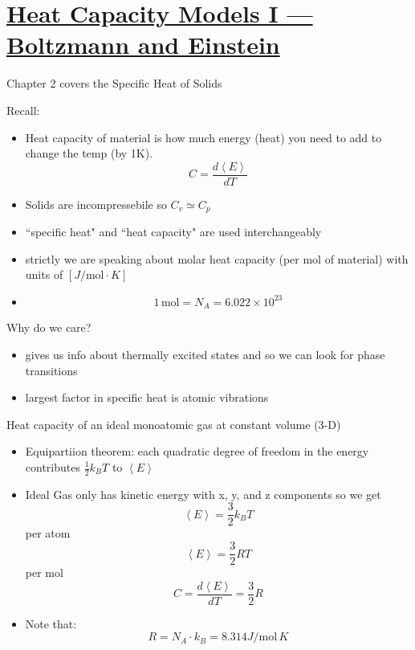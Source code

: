 \section[Heat Capacity Models I — Boltzmann and Einstein]{\hyperlink{toc}{Heat Capacity Models I — Boltzmann and Einstein}}


Chapter 2 covers the Specific Heat of Solids

Recall:
\begin{itemize}
    \item Heat capacity of material is how much energy (heat) you need to add to change the temp (by 1K).
    \begin{equation}
        C = \frac{d \left<E \right>}{dT}
    \end{equation}

    \item Solids are incompressebile so $C_v \simeq C_p $
    \item ``specific heat" and ``heat capacity" are used interchangeably
    \item strictly we are speaking about molar heat capacity (per mol of material) with units of $\left[ J/\text{mol}\cdot K\right]$
    \item 
    \[ 1 \, \text{mol} = N_A = 6.022 \times 10^{23}\]

\end{itemize}

Why do we care?

\begin{itemize}
    \item gives us info about thermally excited states and so we can look for phase transitions 
    \item largest factor in specific heat is atomic vibrations
\end{itemize}

Heat capacity of an ideal monoatomic gas at constant volume (3-D)
\begin{itemize}
    \item Equipartiion theorem: each quadratic degree of freedom in the energy contributes $\frac{1}{2} k_BT$ to $\left< E\right>$
    \item Ideal Gas only has kinetic energy with x, y, and z components so we get
    \begin{equation}
        \left<E\right> = \frac{3}{2} k_B T
    \end{equation}
    per atom
    \begin{equation}
        \left<E\right> = \frac{3}{2} R T
    \end{equation}
    per mol
    \begin{equation}
        C = \frac{d\left< E \right>}{dT} = \frac{3}{2} R
    \end{equation}

    \item Note that:
    \[R = N_A \cdot k_B = 8.314 J/\text{mol}\,K\]
\end{itemize}

